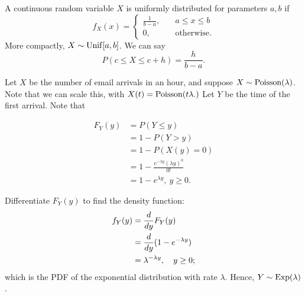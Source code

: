\begin{eg}
A continuous random variable $X$ is uniformly distributed for parameters $a, b$ if
$$
f_X(x)=
\begin{cases}
\frac{1}{b-a}, \quad &a\leq x\leq b \\
0, &\text{otherwise}.
\end{cases}
$$
More compactly, $X\sim \operatorname*{Unif}[a,b]$. We can say
\[
P(c\leq X\leq c+h)=\frac{h}{b-a}
.\] 

\end{eg}
\begin{eg}
Let $X$ be the number of email arrivals in an hour, and suppose $X\sim \operatorname*{Poisson}(\lambda)$. Note that we can scale this, with $X(t)=\operatorname*{Poisson}(t\lambda.)$ Let $Y$ be the time of the first arrival. Note that

\begin{align*}
    F_Y(y)&=P(Y\leq y) \\
    &=1-P(Y>y) \\
    &=1-P(X(y)=0) \\
    &=1-\frac{e^{-\lambda y}(\lambda y)^0}{0!} \\
    &=1-e^{\lambda y}, \ y\geq 0.
\end{align*}

Differentiate $F_Y(y)$ to find the density function:
\begin{align*}
		f_Y(y)&=\frac{d}{dy} F_Y(y) \\
	&= \frac{d}{dy}(1-e^{-\lambda y}) \\
    &= \lambda^{-\lambda y}, \quad y\geq 0;
\end{align*}
which is the PDF of the exponential distribution with rate $\lambda$. Hence, $Y\sim \operatorname*{Exp}(\lambda)$.
\end{eg}

